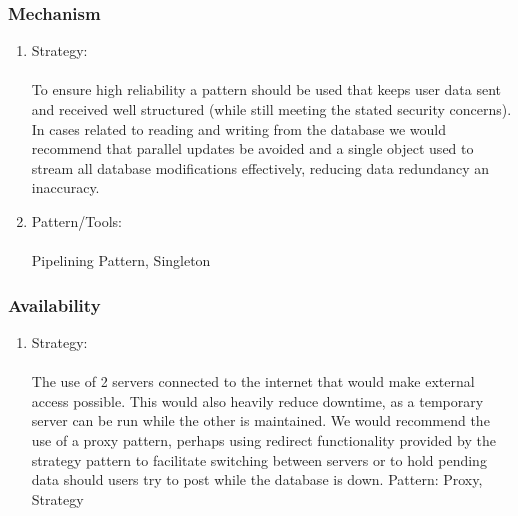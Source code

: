 	
	\subsubsection*{Mechanism}
		\begin{enumerate}
			\item Strategy:\\\\
			To ensure high reliability a pattern should be used that keeps user data sent and received well structured (while still meeting the stated security concerns).
			In cases related to reading and writing from the database we would recommend that parallel updates be avoided and a single object used to stream all database modifications effectively, reducing data redundancy an inaccuracy. 	
			
			
			 \item Pattern/Tools:\\\\
			Pipelining Pattern, Singleton
			 
		\end{enumerate}
		
			
			
			\subsubsection*{Availability}
				\begin{enumerate}
				\item Strategy:\\\\
				The use of 2 servers connected to the internet that would make external access possible. This would also heavily reduce downtime, as a temporary server can be run while the other is maintained. We would recommend the use of a proxy pattern, perhaps using redirect functionality provided by the strategy pattern to facilitate switching between servers or to hold pending data should users try to post while the database is down.
				Pattern: Proxy, Strategy
				
								 
				\end{enumerate}
